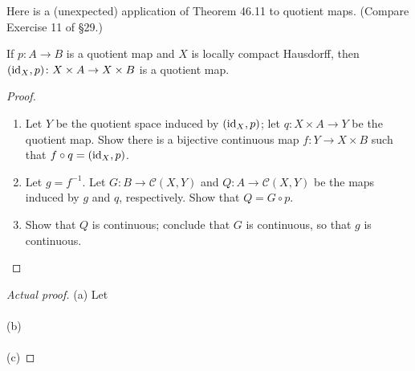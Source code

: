 \begin{problem}[Munkres \S46, Ex.\,9(a,b,c)]
Here is a (unexpected) application of Theorem 46.11 to quotient
maps. (Compare Exercise 11 of \S29.)
\begin{theorem*}
If $p\colon A\to B$ is a quotient map and $X$ is locally compact
Hausdorff, then $(\operatorname{id}_X,p)\colon X\times A\to X\times B$ is a
quotient map.
\begin{proof}
\renewcommand\qedsymbol{\null}
\begin{enumerate}[label=(\alph*)]
\item Let $Y$ be the quotient space induced by $(\operatorname{id}_X,p)$; let
  $q\colon X\times A\to Y$ be the quotient map. Show there is a
  bijective continuous map $f\colon Y\to X\times B$ such that
  $f\circ q=(\operatorname{id}_X,p)$.
\item Let $g=f^{-1}$. Let $G\colon B\to\mathcal{C}(X,Y)$ and
  $Q\colon A\to\mathcal{C}(X,Y)$ be the maps induced by $g$ and
  $q$, respectively. Show that $Q=G\circ p$.
\item Show that $Q$ is continuous; conclude that $G$ is
  continuous, so that $g$ is continuous.
\end{enumerate}
\end{proof}
\end{theorem*}
\end{problem}
\begin{proof}[Actual proof]
(a) Let
\\\\
(b)
\\\\
(c)
\end{proof}
